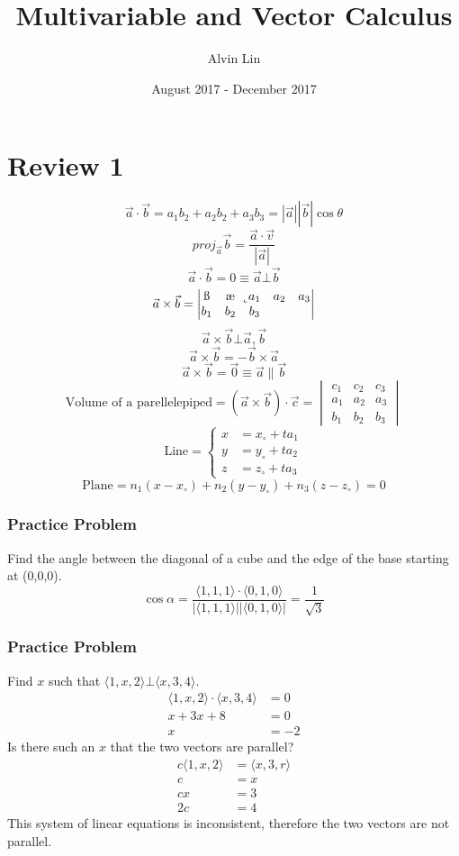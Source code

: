 \documentclass[letterpaper, 12pt]{math}
\title{Multivariable and Vector Calculus}
\author{Alvin Lin}
\date{August 2017 - December 2017}
\begin{document}
\maketitle

\section*{Review 1}
\[ \vec{a}\cdot\vec{b} = a_1b_2+a_2b_2+a_3b_3 =
  |\vec{a}||\vec{b}|\cos\theta \]
\[ proj_{\vec{a}}\vec{b} = \frac{\vec{a}\cdot\vec{v}}{|\vec{a}|} \]
\[ \vec{a}\cdot\vec{b} = 0 \equiv \vec{a}\bot\vec{b} \]
\[ \vec{a}\times\vec{b} = \begin{vmatrix}
  \i & \j & \k \\
  a_1 & a_2 & a_3 \\
  b_1 & b_2 & b_3
\end{vmatrix} \]
\[ \vec{a}\times\vec{b}\bot\vec{a},\vec{b} \]
\[ \vec{a}\times\vec{b} = -\vec{b}\times\vec{a} \]
\[ \vec{a}\times\vec{b} = \vec{0} \equiv \vec{a}\parallel\vec{b} \]
\[ \text{Volume of a parellelepiped} = (\vec{a}\times\vec{b})\cdot\vec{c} =
\begin{vmatrix}
  c_1 & c_2 & c_3 \\
  a_1 & a_2 & a_3 \\
  b_1 & b_2 & b_3
\end{vmatrix} \]
\[ \text{Line} = \begin{cases}
  x &= x_{\circ}+ta_1 \\
  y &= y_{\circ}+ta_2 \\
  z &= z_{\circ}+ta_3
\end{cases} \]
\[ \text{Plane} = n_1(x-x_{\circ})+n_2(y-y_{\circ})+n_3(z-z_{\circ}) = 0 \]

\subsubsection*{Practice Problem}
Find the angle between the diagonal of a cube and the edge of the base
starting at (0,0,0).
\[ \cos\alpha = \frac{\langle1,1,1\rangle\cdot\langle0,1,0\rangle}
  {|\langle1,1,1\rangle||\langle0,1,0\rangle|} = \frac{1}{\sqrt{3}} \]

\subsubsection*{Practice Problem}
Find \( x \) such that \( \langle1,x,2\rangle\bot\langle x,3,4\rangle \).
\begin{align*}
  \langle1,x,2\rangle\cdot\langle x,3,4\rangle &= 0 \\
  x+3x+8 &= 0 \\
  x &= -2
\end{align*}
Is there such an \( x \) that the two vectors are parallel?
\begin{align*}
  c\langle1,x,2\rangle &= \langle x,3,r\rangle \\
  c &= x \\
  cx &= 3 \\
  2c &= 4
\end{align*}
This system of linear equations is inconsistent, therefore the two vectors
are not parallel.
\end{document}
